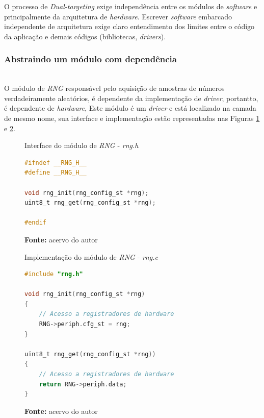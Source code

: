 \documentclass[times, twoside, watermark]{artigo}
\begin{document}
O processo de \textit{Dual-targeting} exige independência
entre os módulos de \textit{software} e principalmente da arquitetura de 
\textit{hardware}.
Escrever \textit{software} embarcado independente de arquitetura exige claro
entendimento dos limites entre o código da aplicação e demais códigos (bibliotecas, 
\textit{drivers}).

\subsubsection{Abstraindo um módulo com dependência}\hfill\\

O módulo de \textit{RNG} responsável pelo aquisição de amostras de números 
verdadeiramente aleatórios, é dependente da implementação de \textit{driver},
portantto, é dependente de \textit{hardware}, 
Este módulo é um \textit{driver} e está localizado na camada de mesmo nome, sua 
interface e implementação estão representadas
nas Figuras \ref{fig:rng.h} e \ref{fig:rng.c}.\hfill\

\begin{figure}[H]
  \centering
  \caption{Interface do módulo de \textit{RNG} - \textit{rng.h}}
\begin{lstlisting}[language=C]
#ifndef __RNG_H__
#define __RNG_H__

void rng_init(rng_config_st *rng);
uint8_t rng_get(rng_config_st *rng);

#endif
\end{lstlisting}
  \label{fig:rng.h}
  \caption*{\newline\textbf{Fonte:} acervo do autor}
\end{figure}


\begin{figure}[H]
  \centering
  \caption{Implementação do módulo de \textit{RNG} - \textit{rng.c}}
\begin{lstlisting}[language=C]
#include "rng.h"

void rng_init(rng_config_st *rng)
{
    // Acesso a registradores de hardware
    RNG->periph.cfg_st = rng;
}

uint8_t rng_get(rng_config_st *rng))
{
    // Acesso a registradores de hardware
    return RNG->periph.data;
}

\end{lstlisting}
  \label{fig:rng.c}
  \caption*{\newline\textbf{Fonte:} acervo do autor}
\end{figure}
\end{document}
